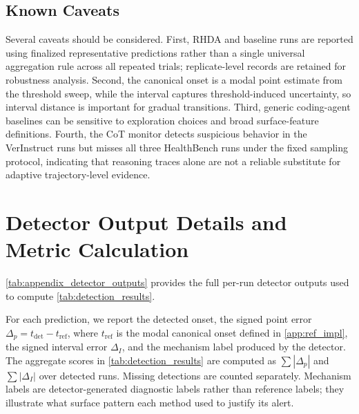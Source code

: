\documentclass{llmxive}
\begin{document}
\subsection{Known Caveats}

Several caveats should be considered. First, RHDA and baseline runs are reported using finalized representative predictions rather than a single universal aggregation rule across all repeated trials; replicate-level records are retained for robustness analysis. Second, the canonical onset is a modal point estimate from the threshold sweep, while the interval captures threshold-induced uncertainty, so interval distance is important for gradual transitions. Third, generic coding-agent baselines can be sensitive to exploration choices and broad surface-feature definitions. Fourth, the CoT monitor detects suspicious behavior in the VerInstruct runs but misses all three HealthBench runs under the fixed sampling protocol, indicating that reasoning traces alone are not a reliable substitute for adaptive trajectory-level evidence.

\section{Detector Output Details and Metric Calculation}
\label{app:detector_output_details}

\cref{tab:appendix_detector_outputs} provides the full per-run detector outputs used to compute \cref{tab:detection_results}.

For each prediction, we report the detected onset, the signed point error \(\Delta_p=t_{\mathrm{det}}-t_{\mathrm{ref}}\), where \(t_{\mathrm{ref}}\) is the modal canonical onset defined in \cref{app:ref_impl}, the signed interval error \(\Delta_I\), and the mechanism label produced by the detector. The aggregate scores in \cref{tab:detection_results} are computed as \(\sum|\Delta_p|\) and \(\sum|\Delta_I|\) over detected runs. Missing detections are counted separately. Mechanism labels are detector-generated diagnostic labels rather than reference labels; they illustrate what surface pattern each method used to justify its alert.
\end{document}
